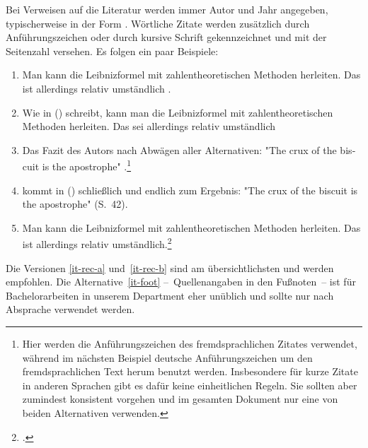 Bei Verweisen auf die Literatur werden immer Autor und Jahr angegeben,
typischerweise in der Form \parencite{weitz2}.  Wörtliche Zitate werden
zusätzlich durch Anführungszeichen oder durch kursive Schrift gekennzeichnet
und mit der Seitenzahl versehen.  Es folgen ein paar Beispiele:
\begin{enumerate}[label=(\roman*)]
\item\label{it-rec-a} Man kann die Leibnizformel mit zahlentheoretischen Methoden herleiten.
  Das ist allerdings relativ umständlich \parencite{weitz}.
\item Wie \citeauthor{weitz} in (\citeyear{weitz}) schreibt, kann man die
  Leibnizformel mit zahlentheoretischen Methoden herleiten.  Das sei
  allerdings relativ umständlich
\item\label{it-rec-b} Das Fazit des Autors nach Abwägen aller Alternativen:
  \foreignlanguage{english}{"The crux of the biscuit is the
    apostrophe"} \parencite[S.\ 42]{zappa}.\footnote{Hier werden die
    Anführungszeichen des fremdsprachlichen Zitates verwendet, während im
    nächsten Beispiel deutsche Anführungszeichen um den fremdsprachlichen Text
    herum benutzt werden.  Insbesondere für kurze Zitate in anderen Sprachen
    gibt es dafür keine einheitlichen Regeln.  Sie sollten aber zumindest
    konsistent vorgehen und im gesamten Dokument nur eine von beiden
    Alternativen verwenden.}
\item \citeauthor{zappa} kommt in (\citeyear{zappa}) schließlich und endlich
  zum Ergebnis: "\foreignlanguage{english}{The crux of the biscuit is the
    apostrophe}" (S.\ 42).
\item\label{it-foot} Man kann die Leibnizformel mit zahlentheoretischen Methoden herleiten.
  Das ist allerdings relativ umständlich.\footcite{weitz}
\end{enumerate}
Die Versionen \ref{it-rec-a} und~\ref{it-rec-b} sind am übersichtlichsten
und werden empfohlen.  Die Alternative~\ref{it-foot} --~Quellenangaben in den
Fußnoten~-- ist für Bachelorarbeiten in unserem Department eher unüblich und
sollte nur nach Absprache verwendet werden.

